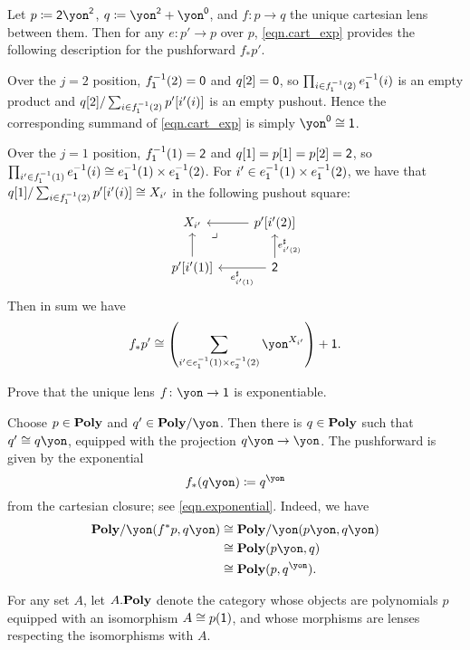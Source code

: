 \documentclass[Book-Poly]{subfiles}
\begin{document}
\begin{example}
Let $p\coloneqq\2\yon^\2$, $q\coloneqq\yon^\2+\yon^\0$, and $f\colon p\to q$ the unique cartesian lens between them.
Then for any $e\colon p'\to p$ over $p$, \eqref{eqn.cart_exp} provides the following description for the pushforward $f_*p'$.

Over the $j=2$ position, $f_\1\inv(2)=\0$ and $q[2]=\0$, so $\prod_{i \in f_\1\inv(2)} e_\1\inv(i)$ is an empty product and $q[2]/\sum_{i\in f_\1\inv(2)} p'[i'(i)]$ is an empty pushout.
Hence the corresponding summand of \eqref{eqn.cart_exp} is simply $\yon^\0\cong\1$.

Over the $j=1$ position, $f_\1\inv(1)=\2$ and $q[1]=p[1]=p[2]=\2$, so $\prod_{i'\in f_\1\inv(1)} e_\1\inv(i) \iso e_\1\inv(1)\times e_\1\inv(2)$.
For $i' \in e_\1\inv(1) \times e_\1\inv(2)$, we have that $q[1]/\sum_{i\in f_\1\inv(2)} p'[i'(i)] \iso X_{i'}$ in the following pushout square:
\[
\begin{tikzcd}
	X_{i'} \ar[from=r] \ar[from=d] &
	p'[i'(2)] \ar[from=d, "e^\sharp_{i'(2)}"'] \\
	p'[i'(1)] \ar[from=r, "e^\sharp_{i'(1)}"] &
	\2 \ar[ul, phantom, very near end, "\lrcorner"]
\end{tikzcd}
\]
Then in sum we have
\[
    f_*p' \iso \left(\sum_{i' \in e_\1\inv(1) \times e_2\inv(2)} \yon^{X_{i'}}\right) + \1.
\]
\end{example}

\begin{exercise}
Prove that the unique lens $f\colon\yon\to\1$ is exponentiable.
\begin{solution}
Choose $p\in\poly$ and $q'\in\poly/\yon$. Then there is $q\in\poly$ such that $q'\cong q\yon$, equipped with the projection $q\yon\to\yon$. The pushforward is given by the exponential
\[f_*(q\yon)\coloneqq q^\yon\]
from the cartesian closure; see \eqref{eqn.exponential}. Indeed, we have
\begin{align*}
	\poly/\yon(f^*p,q\yon)&\cong
	\poly/\yon(p\yon,q\yon)\\&\cong
	\poly(p\yon,q)\\&\cong
	\poly(p,q^\yon).
\end{align*}
\end{solution}
\end{exercise}

For any set $A$, let $\poly[A.]$ denote the category whose objects are polynomials $p$ equipped with an isomorphism $A\cong p(\1)$, and whose morphisms are lenses respecting the isomorphisms with $A$.
\end{document}
